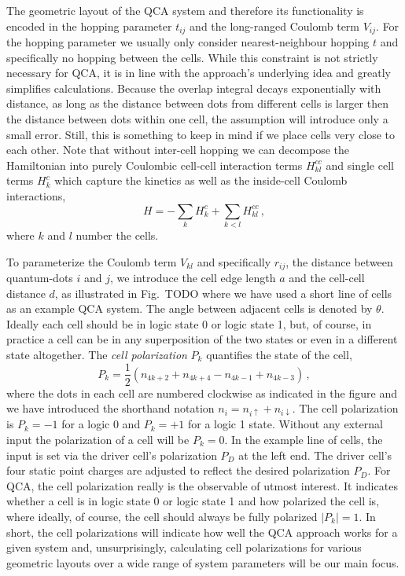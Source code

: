 The geometric layout of the QCA system and therefore its functionality is
encoded in the hopping parameter $t_{ij}$ and the long-ranged Coulomb term
$V_{ij}$. For the hopping parameter we usually only consider nearest-neighbour
hopping $t$ and specifically no hopping between the cells. While this constraint is
not strictly necessary for QCA, it is in line with the approach's underlying
idea and greatly simplifies calculations. Because the overlap integral decays
exponentially with distance, as long as the distance between dots from different
cells is larger then the distance between dots within one cell, the assumption will
introduce only a small error. Still, this is something to keep in mind if we
place cells very close to each other. Note that without inter-cell hopping we can
decompose the Hamiltonian into purely Coulombic cell-cell interaction terms
$H^{cc}_{kl}$ and single cell terms $H^c_k$ which capture the kinetics as well
as the inside-cell Coulomb interactions,
\begin{equation}
  \label{eq:H_cell}
  H = - \sum_k H^c_k + \sum_{k<l} H^{cc}_{kl} \, ,
\end{equation}
where $k$ and $l$ number the cells. 

To parameterize the Coulomb term $V_{kl}$ and specifically $r_{ij}$, the
distance between quantum-dots $i$ and $j$, we introduce the cell edge length $a$
and the cell-cell distance $d$, as illustrated in Fig.~TODO where we have used a
short line of cells as an example QCA system. The angle between adjacent cells
is denoted by $\theta$. Ideally each cell should be in logic state 0 or logic state 1,
but, of course, in practice a cell can be in any superposition of the two states
or even in a different state altogether. The \emph{cell polarization} $P_k$ quantifies
the state of the cell,
\begin{equation}
  \label{eq:polarization}
  P_k = \frac{1}{2} \left( n_{4k+2} + n_{4k+4} - n_{4k-1} + n_{4k-3} \right) \, ,
\end{equation}
where the dots in each cell are numbered clockwise as indicated in the figure
and we have introduced the shorthand notation $n_i = n_{i\uparrow} +
n_{i\downarrow}$. The
cell polarization is $P_k = -1$ for a logic 0 and $P_k = +1$ for a logic 1
state. Without any external input the polarization of a cell will be $P_k = 0$.
In the example line of cells, the input is set via the driver cell's
polarization $P_D$ at the left end. The driver cell's four static
point charges are adjusted to reflect the desired polarization $P_D$. For QCA, 
the cell polarization really is the observable of utmost interest. It indicates
whether a cell is in logic state 0 or logic state 1 and how polarized the cell
is, where ideally, of course, the cell should always be fully polarized $|P_k| =
1$. In short, the cell polarizations will indicate how well the QCA approach
works for a given system and, unsurprisingly, calculating cell polarizations for
various geometric layouts over a wide range of system parameters will be our main
focus.

